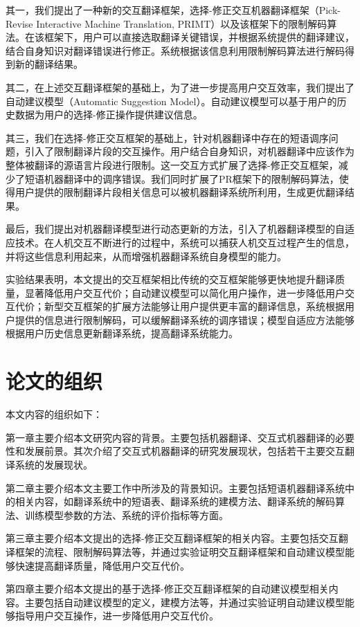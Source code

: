 \documentclass[master, winfont]{njuthesis}
\begin{document}
其一，我们提出了一种新的交互翻译框架，选择-修正交互机器翻译框架（Pick-Revise Interactive Machine Translation, PRIMT）以及该框架下的限制解码算法。在该框架下，用户可以直接选取翻译关键错误，并根据系统提供的翻译建议，结合自身知识对翻译错误进行修正。系统根据该信息利用限制解码算法进行解码得到新的翻译结果。

其二，在上述交互翻译框架的基础上，为了进一步提高用户交互效率，我们提出了自动建议模型（Automatic Suggestion Model）。自动建议模型可以基于用户的历史数据为用户的选择-修正操作提供建议信息。

其三，我们在选择-修正交互框架的基础上，针对机器翻译中存在的短语调序问题，引入了限制翻译片段的交互操作。用户结合自身知识，对机器翻译中应该作为整体被翻译的源语言片段进行限制。这一交互方式扩展了选择-修正交互框架，减少了短语机器翻译中的调序错误。我们同时扩展了PR框架下的限制解码算法，使得用户提供的限制翻译片段相关信息可以被机器翻译系统所利用，生成更优翻译结果。

最后，我们提出对机器翻译模型进行动态更新的方法，引入了机器翻译模型的自适应技术。在人机交互不断进行的过程中，系统可以捕获人机交互过程产生的信息，并将这些信息利用起来，从而增强机器翻译系统自身模型的能力。

实验结果表明，本文提出的交互框架相比传统的交互框架能够更快地提升翻译质量，显著降低用户交互代价；自动建议模型可以简化用户操作，进一步降低用户交互代价；新型交互框架的扩展方法能够让用户提供更丰富的翻译信息，系统根据用户提供的信息进行限制解码，可以缓解翻译系统的调序错误；模型自适应方法能够根据用户历史信息更新翻译系统，提高翻译系统能力。

\section{论文的组织}
本文内容的组织如下：

第一章主要介绍本文研究内容的背景。主要包括机器翻译、交互式机器翻译的必要性和发展前景。其次介绍了交互式机器翻译的研究发展现状，包括若干主要交互翻译系统的发展现状。

第二章主要介绍本文主要工作中所涉及的背景知识。主要包括短语机器翻译系统中的相关内容，如翻译系统中的短语表、翻译系统的建模方法、翻译系统的解码算法、训练模型参数的方法、系统的评价指标等方面。

第三章主要介绍本文提出的选择-修正交互翻译框架的相关内容。主要包括交互翻译框架的流程、限制解码算法等，并通过实验证明交互翻译框架和自动建议模型能够快速提高翻译质量，降低用户交互代价。

第四章主要介绍本文提出的基于选择-修正交互翻译框架的自动建议模型相关内容。主要包括自动建议模型的定义，建模方法等，并通过实验证明自动建议模型能够指导用户交互操作，进一步降低用户交互代价。
\end{document}
